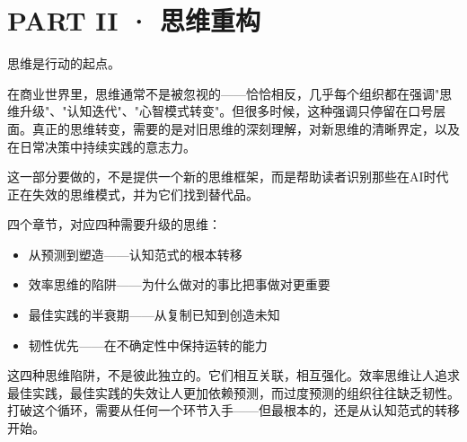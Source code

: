 \part{PART II · 思维重构}



思维是行动的起点。

在商业世界里，思维通常不是被忽视的——恰恰相反，几乎每个组织都在强调"思维升级"、"认知迭代"、"心智模式转变"。但很多时候，这种强调只停留在口号层面。真正的思维转变，需要的是对旧思维的深刻理解，对新思维的清晰界定，以及在日常决策中持续实践的意志力。

这一部分要做的，不是提供一个新的思维框架，而是帮助读者识别那些在AI时代正在失效的思维模式，并为它们找到替代品。

四个章节，对应四种需要升级的思维：
\begin{itemize}
\item 从预测到塑造——认知范式的根本转移
\item 效率思维的陷阱——为什么做对的事比把事做对更重要
\item 最佳实践的半衰期——从复制已知到创造未知
\item 韧性优先——在不确定性中保持运转的能力

\end{itemize}
这四种思维陷阱，不是彼此独立的。它们相互关联，相互强化。效率思维让人追求最佳实践，最佳实践的失效让人更加依赖预测，而过度预测的组织往往缺乏韧性。打破这个循环，需要从任何一个环节入手——但最根本的，还是从认知范式的转移开始。
